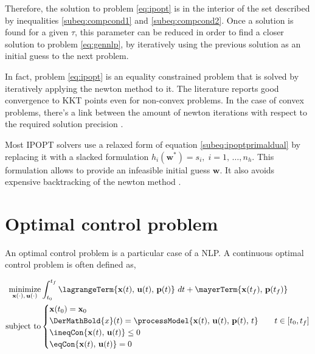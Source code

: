 Therefore, the solution to problem \eqref{eq:ipopt} is in the interior of the set described by inequalities \eqref{subeq:compcond1} and \eqref{subeq:compcond2}. Once a solution is found for a given $\tau$, this parameter can be reduced in order to find a closer solution to problem \eqref{eq:gennlp}, by iteratively using the previous solution as an initial guess to the next problem.

In fact, problem \eqref{eq:ipopt} is an equality constrained problem that is solved by iteratively applying the newton method to it. The literature reports good convergence to KKT points even for non-convex problems. In the case of convex problems, there's a link between the amount of newton iterations with respect to the required solution precision \cite{diehlnumericalocp}.

\begin{remark}
Most IPOPT solvers use a relaxed form of equation \eqref{subeq:ipoptprimaldual} by replacing it with a slacked formulation $h_i\left( \mathbf{w}^*\right) = s_i,\;i = 1,\,\ldots,n_h$. This formulation allows to provide an infeasible initial guess $\mathbf{w}$. It also avoids expensive backtracking of the newton method \cite{diehlnumericalocp}.
\end{remark}

\section{Optimal control problem}
\label{section:optimalControlProblems}

An optimal control problem is a particular case of a NLP. A continuous optimal control problem \cite{diehlnumericalocp} is often defined as,

\begin{subequations}
	\begin{align}
		\underset{\mathbf{x}(\cdot),\,\mathbf{u}(\cdot)}{\text{minimize}} &\int_{t_0}^{t_f} \lagrangeTerm{\mathbf{x}(t),\, \mathbf{u}(t),\, \mathbf{p}(t)}\ dt + \mayerTerm{\mathbf{x}(t_f),\, \mathbf{p}(t_f)}\\
		\text{subject to}&
		\begin{cases}
			\mathbf{x}(t_0) =\mathbf{x}_0\\
			\DerMathBold{x}(t) = \processModel{\mathbf{x}(t),\,\mathbf{u}(t),\, \mathbf{p}(t),\,t} \quad & t \in [t_0, t_f]\\
			\ineqCon{\mathbf{x}(t),\,\mathbf{u}(t)} \leq 0\\
			\eqCon{\mathbf{x}(t),\,\mathbf{u}(t)} = 0
		\end{cases}
	\end{align}
	\label{eq:continuousTimeOCP}
\end{subequations}


